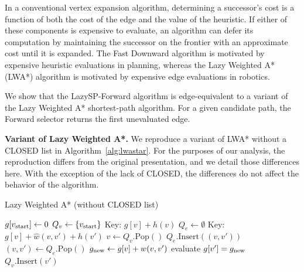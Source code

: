 In a conventional vertex expansion algorithm,
determining a successor's cost is a function of both
the cost of the edge and the value of the heuristic.
If either of these components is expensive to evaluate,
an algorithm can defer its computation by maintaining the successor
on the frontier with an approximate cost until it is expanded.
The Fast Downward algorithm \citep{helmert2006fastdownward} is motivated
by expensive heuristic evaluations in planning,
whereas the Lazy Weighted A* (LWA*) algorithm \citep{cohen2014narms}
is motivated by expensive edge evaluations in robotics.

We show that the LazySP-Forward algorithm
is edge-equivalent to a variant of the Lazy Weighted A*
shortest-path algorithm.
For a given candidate path,
the Forward selector returns the first unevaluated edge.

\textbf{Variant of Lazy Weighted A*.}
We reproduce a variant of LWA* without a CLOSED list
in Algorithm~\ref{alg:lwastar}.
For the purposes of our analysis,
the reproduction differs from the original presentation,
and we detail those differences here.
With the exception of the lack of CLOSED,
the differences do not affect the behavior of the algorithm.

\begin{algorithm}[t]
\caption{Lazy Weighted A* (without CLOSED list)}
\label{alg:lwastar}
\begin{algorithmic}[1]
\State $g[v_{\mbox{\scriptsize start}}] \leftarrow 0$
\State $Q_v \leftarrow \{ v_{\mbox{\scriptsize start}} \}$
   \Comment Key: $g[v] + h(v)$
   \label{line:lwastar-key-qvertices}
\State $Q_e \leftarrow \emptyset$
   \Comment Key: $g[v] + \hat{w}(v,v') + h(v')$
   \label{line:lwastar-key-qedges}
      \State $v \leftarrow Q_v.{\mbox{Pop}}()$
         \State $Q_e.\mbox{Insert}((v,v'))$
      \EndFor
   \Else
      \State $(v,v') \leftarrow Q_e.{\mbox{Pop}}()$
         \label{line:lwastar-test}
      \EndIf
      \State $g_{\mbox{\scriptsize new}} \leftarrow g[v] + w(v,v')$
         \Comment evaluate
         \State $g[v'] = g_{\mbox{\scriptsize new}}$
         \State $Q_v.\mbox{Insert}(v')$
      \EndIf
   \EndIf
\EndWhile
\EndFunction
\end{algorithmic}
\end{algorithm}

